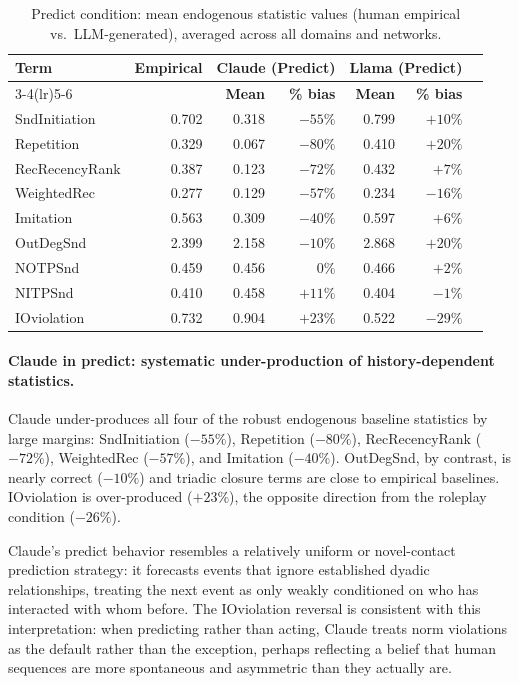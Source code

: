 \documentclass[11pt]{article}
\begin{document}
\begin{table}[H]
\centering
\caption{Predict condition: mean endogenous statistic values (human empirical
vs.\ LLM-generated), averaged across all domains and networks.}
\label{tab:predict}
\begin{tabular}{lrrrrrr}
\toprule
\multirow{2}{*}{\textbf{Term}} &
\multirow{2}{*}{\textbf{Empirical}} &
\multicolumn{2}{c}{\textbf{Claude (Predict)}} &
\multicolumn{2}{c}{\textbf{Llama (Predict)}} \\
\cmidrule(lr){3-4}\cmidrule(lr){5-6}
& & \textbf{Mean} & \textbf{\% bias} & \textbf{Mean} & \textbf{\% bias} \\
\midrule
SndInitiation  & 0.702 & 0.318 & $-55\%$ & 0.799 & $+10\%$ \\
Repetition     & 0.329 & 0.067 & $-80\%$ & 0.410 & $+20\%$ \\
RecRecencyRank & 0.387 & 0.123 & $-72\%$ & 0.432 & $+7\%$  \\
WeightedRec    & 0.277 & 0.129 & $-57\%$ & 0.234 & $-16\%$ \\
Imitation      & 0.563 & 0.309 & $-40\%$ & 0.597 & $+6\%$  \\
OutDegSnd      & 2.399 & 2.158 & $-10\%$ & 2.868 & $+20\%$ \\
NOTPSnd        & 0.459 & 0.456 &  $0\%$  & 0.466 & $+2\%$  \\
NITPSnd        & 0.410 & 0.458 & $+11\%$ & 0.404 & $-1\%$  \\
IOviolation    & 0.732 & 0.904 & $+23\%$ & 0.522 & $-29\%$ \\
\bottomrule
\end{tabular}
\end{table}

\paragraph{Claude in predict: systematic under-production of history-dependent statistics.}
Claude under-produces all four of the robust endogenous baseline statistics
by large margins: SndInitiation ($-55\%$), Repetition ($-80\%$),
RecRecencyRank ($-72\%$), WeightedRec ($-57\%$), and Imitation ($-40\%$).
OutDegSnd, by contrast, is nearly correct ($-10\%$) and triadic closure
terms are close to empirical baselines. IOviolation is over-produced
($+23\%$), the opposite direction from the roleplay condition ($-26\%$).

Claude's predict behavior resembles a relatively uniform or novel-contact
prediction strategy: it forecasts events that ignore established dyadic
relationships, treating the next event as only weakly conditioned on who
has interacted with whom before. The IOviolation reversal is consistent
with this interpretation: when predicting rather than acting,
Claude treats norm violations as the default rather than the exception,
perhaps reflecting a belief that human sequences are more spontaneous
and asymmetric than they actually are.
\end{document}
